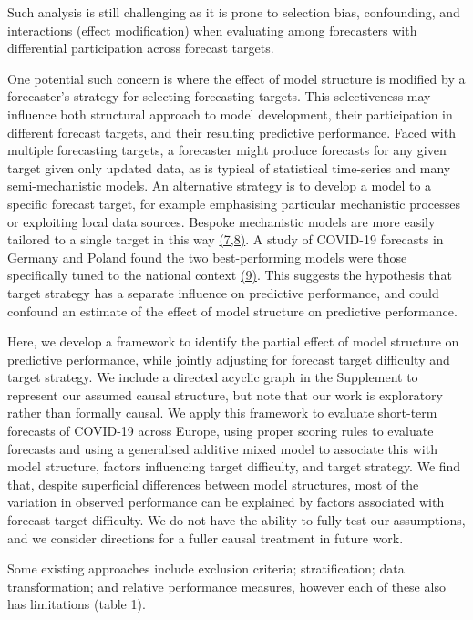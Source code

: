 \documentclass[
  letterpaper,
  DIV=11,
  numbers=noendperiod]{scrartcl}
\begin{document}
Such analysis is still challenging as it is prone to selection bias,
confounding, and interactions (effect modification) when evaluating
among forecasters with differential participation across forecast
targets.

One potential such concern is where the effect of model structure is
modified by a forecaster's strategy for selecting forecasting targets.
This selectiveness may influence both structural approach to model
development, their participation in different forecast targets, and
their resulting predictive performance. Faced with multiple forecasting
targets, a forecaster might produce forecasts for any given target given
only updated data, as is typical of statistical time-series and many
semi-mechanistic models. An alternative strategy is to develop a model
to a specific forecast target, for example emphasising particular
mechanistic processes or exploiting local data sources. Bespoke
mechanistic models are more easily tailored to a single target in this
way \href{https://www.zotero.org/google-docs/?vo794b}{(7,8)}. A study of
COVID-19 forecasts in Germany and Poland found the two best-performing
models were those specifically tuned to the national context
\href{https://www.zotero.org/google-docs/?7QAdmm}{(9)}. This suggests
the hypothesis that target strategy has a separate influence on
predictive performance, and could confound an estimate of the effect of
model structure on predictive performance.

Here, we develop a framework to identify the partial effect of model
structure on predictive performance, while jointly adjusting for
forecast target difficulty and target strategy. We include a directed
acyclic graph in the Supplement to represent our assumed causal
structure, but note that our work is exploratory rather than formally
causal. We apply this framework to evaluate short-term forecasts of
COVID-19 across Europe, using proper scoring rules to evaluate forecasts
and using a generalised additive mixed model to associate this with
model structure, factors influencing target difficulty, and target
strategy. We find that, despite superficial differences between model
structures, most of the variation in observed performance can be
explained by factors associated with forecast target difficulty. We do
not have the ability to fully test our assumptions, and we consider
directions for a fuller causal treatment in future work.

Some existing approaches include exclusion criteria; stratification;
data transformation; and relative performance measures, however each of
these also has limitations (table 1).
\end{document}
